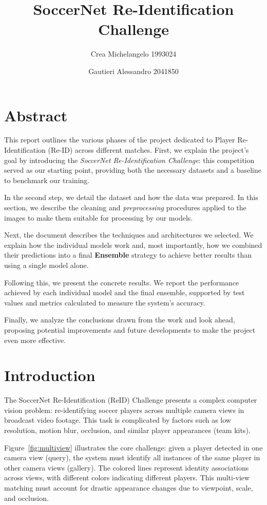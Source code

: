 \documentclass[10pt,twocolumn,letterpaper]{article}
\title{SoccerNet Re-Identification Challenge}
\author{
Crea Michelangelo 1993024 \and Gautieri Alessandro 2041850\\
}
\begin{document}
\maketitle

\section*{Abstract}
This report outlines the various phases of the project dedicated to Player Re-Identification (Re-ID) across different matches. First, we explain the project's goal by introducing the \textit{SoccerNet Re-Identification Challenge}: this competition served as our starting point, providing both the necessary datasets and a baseline to benchmark our training.

In the second step, we detail the dataset and how the data was prepared. In this section, we describe the cleaning and \textit{preprocessing} procedures applied to the images to make them suitable for processing by our models.

Next, the document describes the techniques and architectures we selected. We explain how the individual models work and, most importantly, how we combined their predictions into a final \textbf{Ensemble} strategy to achieve better results than using a single model alone.

Following this, we present the concrete results. We report the performance achieved by each individual model and the final ensemble, supported by test values and metrics calculated to measure the system's accuracy.

Finally, we analyze the conclusions drawn from the work and look ahead, proposing potential improvements and future developments to make the project even more effective.


\section{Introduction}
The SoccerNet Re-Identification (ReID) Challenge presents a complex computer vision problem: re-identifying soccer players across multiple camera views in broadcast video footage. This task is complicated by factors such as low resolution, motion blur, occlusion, and similar player appearances (team kits).

Figure~\ref{fig:multiview} illustrates the core challenge: given a player detected in one camera view (query), the system must identify all instances of the same player in other camera views (gallery). The colored lines represent identity associations across views, with different colors indicating different players. This multi-view matching must account for drastic appearance changes due to viewpoint, scale, and occlusion.
\end{document}
